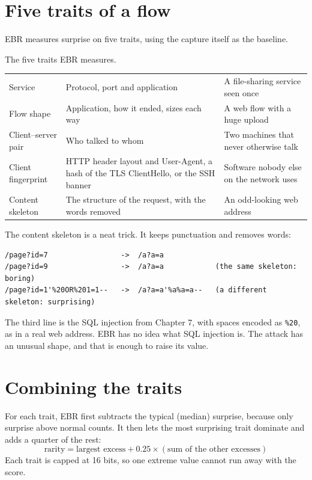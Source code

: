 \section{Five traits of a flow}
EBR measures surprise on five traits, using the capture itself as the baseline.

\begin{gtable}{The five traits EBR measures.}
\begin{tabularx}{\linewidth}{l L L}
\toprule
{} &  & \\
\midrule
Service & Protocol, port and application & A file-sharing service seen once\\
Flow shape & Application, how it ended, sizes each way & A web flow with a huge upload\\
Client--server pair & Who talked to whom & Two machines that never otherwise talk\\
Client fingerprint & HTTP header layout and User-Agent, a hash of the TLS ClientHello, or the SSH banner & Software nobody else on the network uses\\
Content skeleton & The structure of the request, with the words removed & An odd-looking web address\\
\bottomrule
\end{tabularx}
\end{gtable}

The content skeleton is a neat trick. It keeps punctuation and removes words:
\begin{lstlisting}
/page?id=7                 ->  /a?a=a
/page?id=9                 ->  /a?a=a            (the same skeleton: boring)
/page?id=1'%20OR%201=1--   ->  /a?a=a'%a%a=a--   (a different skeleton: surprising)
\end{lstlisting}
The third line is the SQL injection from Chapter 7, with spaces encoded as \texttt{\%20}, as in a real web address. EBR has no idea what SQL injection is. The attack has an unusual shape, and that is enough to raise its value.

\section{Combining the traits}
For each trait, EBR first subtracts the typical (median) surprise, because only surprise above normal counts. It then lets the most surprising trait dominate and adds a quarter of the rest:
\[
\text{rarity} = \text{largest excess} + 0.25 \times (\text{sum of the other excesses})
\]
Each trait is capped at 16 bits, so one extreme value cannot run away with the score.

